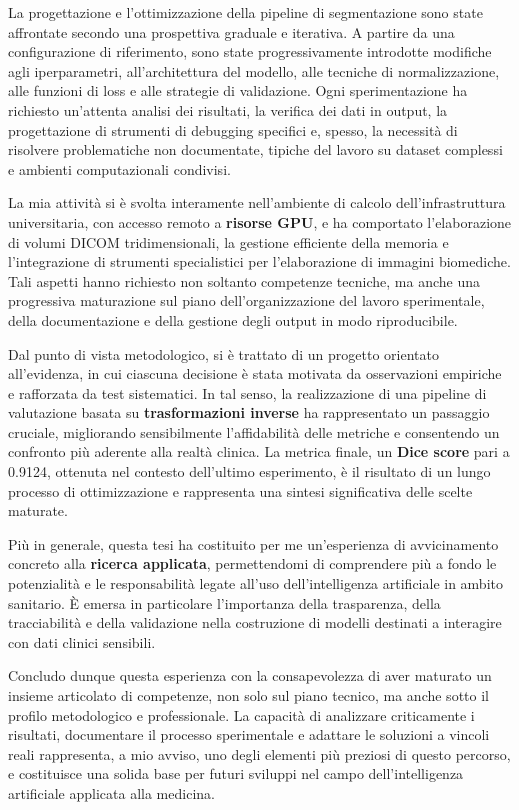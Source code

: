 La progettazione e l’ottimizzazione della pipeline di segmentazione sono state affrontate secondo una prospettiva graduale e iterativa. A partire da una configurazione di riferimento, sono state progressivamente introdotte modifiche agli iperparametri, all’architettura del modello, alle tecniche di normalizzazione, alle funzioni di loss e alle strategie di validazione. Ogni sperimentazione ha richiesto un’attenta analisi dei risultati, la verifica dei dati in output, la progettazione di strumenti di debugging specifici e, spesso, la necessità di risolvere problematiche non documentate, tipiche del lavoro su dataset complessi e ambienti computazionali condivisi.

La mia attività si è svolta interamente nell’ambiente di calcolo dell’infrastruttura universitaria, con accesso remoto a \textbf{risorse GPU}, e ha comportato l’elaborazione di volumi DICOM tridimensionali, la gestione efficiente della memoria e l’integrazione di strumenti specialistici per l’elaborazione di immagini biomediche. Tali aspetti hanno richiesto non soltanto competenze tecniche, ma anche una progressiva maturazione sul piano dell’organizzazione del lavoro sperimentale, della documentazione e della gestione degli output in modo riproducibile.

Dal punto di vista metodologico, si è trattato di un progetto orientato all’evidenza, in cui ciascuna decisione è stata motivata da osservazioni empiriche e rafforzata da test sistematici. In tal senso, la realizzazione di una pipeline di valutazione basata su \textbf{trasformazioni inverse} ha rappresentato un passaggio cruciale, migliorando sensibilmente l’affidabilità delle metriche e consentendo un confronto più aderente alla realtà clinica. La metrica finale, un \textbf{Dice score} pari a 0.9124, ottenuta nel contesto dell’ultimo esperimento, è il risultato di un lungo processo di ottimizzazione e rappresenta una sintesi significativa delle scelte maturate.

Più in generale, questa tesi ha costituito per me un’esperienza di avvicinamento concreto alla \textbf{ricerca applicata}, permettendomi di comprendere più a fondo le potenzialità e le responsabilità legate all’uso dell’intelligenza artificiale in ambito sanitario. È emersa in particolare l’importanza della trasparenza, della tracciabilità e della validazione nella costruzione di modelli destinati a interagire con dati clinici sensibili.

Concludo dunque questa esperienza con la consapevolezza di aver maturato un insieme articolato di competenze, non solo sul piano tecnico, ma anche sotto il profilo metodologico e professionale. La capacità di analizzare criticamente i risultati, documentare il processo sperimentale e adattare le soluzioni a vincoli reali rappresenta, a mio avviso, uno degli elementi più preziosi di questo percorso, e costituisce una solida base per futuri sviluppi nel campo dell’intelligenza artificiale applicata alla medicina.
